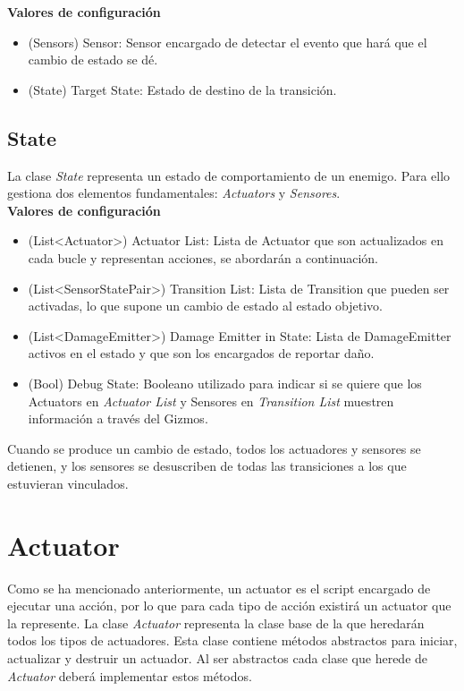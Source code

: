 \textbf{Valores de configuración}
\begin{itemize}
	\item (Sensors) Sensor: Sensor encargado de detectar el evento que hará que el cambio de estado se dé.
	\item (State) Target State: Estado de destino de la transición.
\end{itemize}

\subsection{State}

La clase \textit{State} representa un estado de comportamiento de un enemigo. Para ello gestiona dos elementos fundamentales: \textit{Actuators} y \textit{Sensores}.\\

\textbf{Valores de configuración}
\begin{itemize}
	\item (List<Actuator>) Actuator List: Lista de Actuator que son actualizados en cada bucle y representan acciones, se abordarán a continuación.
	\item (List<SensorStatePair>) Transition List: Lista de Transition que pueden ser activadas, lo que supone un cambio de estado al estado objetivo.
	\item (List<DamageEmitter>) Damage Emitter in State: Lista de DamageEmitter activos en el estado y que son los encargados de reportar daño.
	\item (Bool) Debug State: Booleano utilizado para indicar si se quiere que los Actuators en \textit{Actuator List} y Sensores en \textit{Transition List} muestren información a través del Gizmos.
\end{itemize}
Cuando se produce un cambio de estado, todos los actuadores y sensores se detienen, y los sensores se desuscriben de todas las transiciones a los que estuvieran vinculados.\\

\section{Actuator}

Como se ha mencionado anteriormente, un actuator es el script encargado de ejecutar una acción, por lo que para cada tipo de acción existirá un actuator que la represente.
La clase \textit{Actuator} representa la clase base de la que heredarán todos los tipos de actuadores.
Esta clase contiene métodos abstractos para iniciar, actualizar y destruir un actuador. Al ser abstractos cada clase que herede de \textit{Actuator} deberá implementar estos métodos.\\

